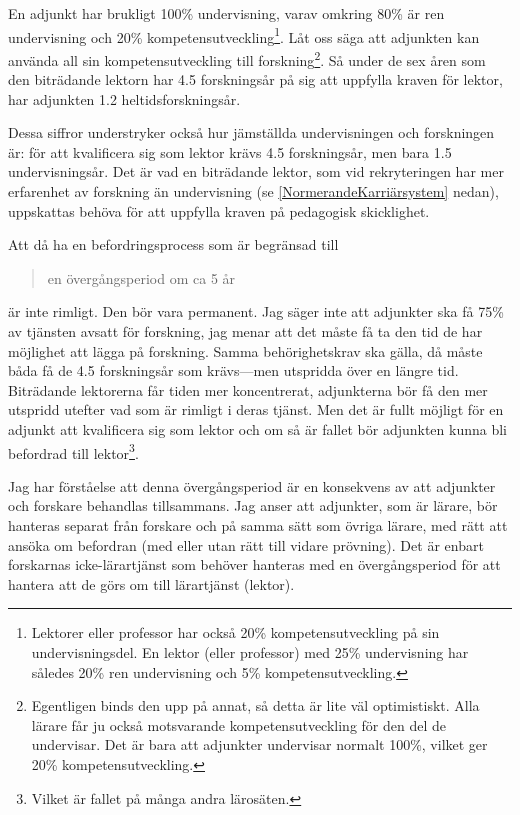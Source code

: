 \documentclass[a4paper,oneside,article,swedish]{memoir}
\begin{document}
En adjunkt har brukligt 100\% undervisning, varav omkring 80\% är ren 
undervisning och 20\% kompetensutveckling\footnote{%
  Lektorer eller professor har också 20\% kompetensutveckling på sin 
  undervisningsdel.
  En lektor (eller professor) med 25\% undervisning har således 20\% ren 
  undervisning och 5\% kompetensutveckling.
}.
Låt oss säga att adjunkten kan använda all sin kompetensutveckling till 
forskning\footnote{%
  Egentligen binds den upp på annat, så detta är lite väl optimistiskt.
  Alla lärare får ju också motsvarande kompetensutveckling för den del de 
  undervisar.
  Det är bara att adjunkter undervisar normalt 100\%, vilket ger 20\% 
  kompetensutveckling.
}.
Så under de sex åren som den biträdande lektorn har 4.5 forskningsår på sig att 
uppfylla kraven för lektor, har adjunkten 1.2 heltidsforskningsår.

Dessa siffror understryker också hur jämställda undervisningen och forskningen 
är:
för att kvalificera sig som lektor krävs 4.5 forskningsår, men bara 1.5 
undervisningsår.
Det är vad en biträdande lektor, som vid rekryteringen har mer erfarenhet av 
forskning än undervisning (se \cref{NormerandeKarriärsystem} nedan), uppskattas 
behöva för att uppfylla kraven på pedagogisk skicklighet.

Att då ha en befordringsprocess som är begränsad till
\blockcquote[s.~2]{utredning}{%
  en övergångsperiod om ca 5 år%
} är inte rimligt.
Den bör vara permanent.
Jag säger inte att adjunkter ska få 75\% av tjänsten avsatt för forskning, jag 
menar att det måste få ta den tid de har möjlighet att lägga på forskning.
Samma behörighetskrav ska gälla, då måste båda få de 4.5 forskningsår som 
krävs---men utspridda över en längre tid.
Biträdande lektorerna får tiden mer koncentrerat, adjunkterna bör få den mer 
utspridd utefter vad som är rimligt i deras tjänst.
Men det är fullt möjligt för en adjunkt att kvalificera sig som lektor och om 
så är fallet bör adjunkten kunna bli befordrad till lektor\footnote{%
  Vilket är fallet på många andra lärosäten.
}.

Jag har förståelse att denna övergångsperiod är en konsekvens av att adjunkter 
och forskare behandlas tillsammans.
Jag anser att adjunkter, som är lärare, bör hanteras separat från forskare och 
på samma sätt som övriga lärare, med rätt att ansöka om befordran (med eller 
utan rätt till vidare prövning).
Det är enbart forskarnas icke-lärartjänst som behöver hanteras med en 
övergångsperiod för att hantera att de görs om till lärartjänst (lektor).
\end{document}
